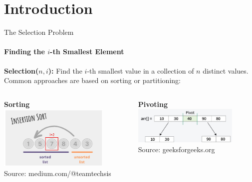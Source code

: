 
\author{SEA 2025 \hspace{1cm} Johanna Hofmann}
\section{Introduction}


\begin{frame}{The Selection Problem}
  \framesubtitle{Finding the $i$-th Smallest Element}
  \textbf{Selection($n,i$):} Find the $i$-th smallest value in a collection of $n$ distinct values.
  \vfill
  \centering
  Common approaches are based on sorting or partitioning:
  \begin{columns}[T]
    \begin{column}{0.45\textwidth}
      \centering
      \textbf{Sorting}\\
      \includegraphics[width=0.8\textwidth, trim={0 0 0 3.5cm}, clip]{figures/Insertion_sort.jpg}\\
      \tiny{Source: medium.com/@teamtechsis}
    \end{column}
    \begin{column}{0.45\textwidth}
      \centering
      \textbf{Pivoting}\\
      \includegraphics[width=0.8\textwidth]{figures/Pivot.jpg}\\
      \tiny{Source: geeksforgeeks.org}
    \end{column}
  \end{columns}


\end{frame}

